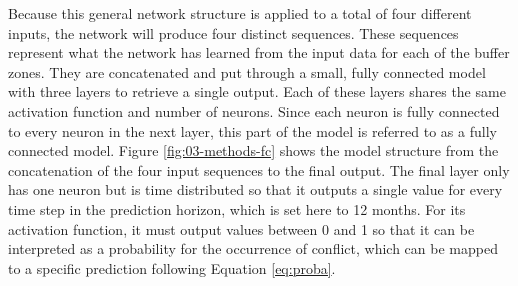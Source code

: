 \documentclass[a4paper,11pt]{article}
\begin{document}
Because this general network structure is applied to a total of four different
inputs, the network will produce four distinct sequences.
These sequences represent what the network has learned from the
input data for each of the buffer zones. They are concatenated and put
through a small, fully connected model with three layers to retrieve a single
output. Each of these layers shares the same activation function and number
of neurons. Since each neuron is fully connected to every neuron in the next layer,
this part of the model is referred to as a fully connected model. Figure \ref{fig:03-methods-fc}
shows the model structure from the concatenation of the four input sequences to
the final output. The final layer only has one neuron but is time distributed so that
it outputs a single value for every time step in the prediction horizon, which is
set here to 12 months. For its activation function, it must output values between
0 and 1 so that it can be interpreted as a probability for the occurrence of
conflict, which can be mapped to a specific prediction following Equation \eqref{eq:proba}.
\end{document}
